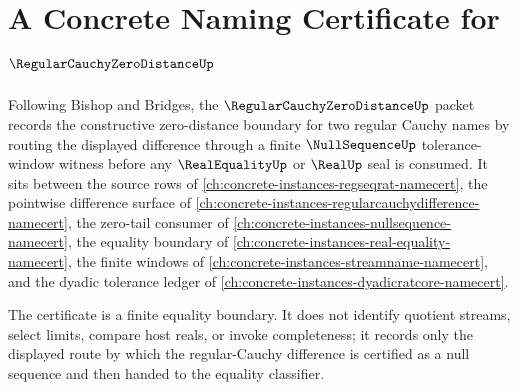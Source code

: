 \chapter{A Concrete Naming Certificate for $\RegularCauchyZeroDistanceUp$}
\label{ch:concrete-instances-regular-cauchy-zero-distance-namecert}

Following Bishop and Bridges, the $\RegularCauchyZeroDistanceUp$ packet records the constructive zero-distance boundary for two regular Cauchy names by routing the displayed difference through a finite $\NullSequenceUp$ tolerance-window witness before any $\RealEqualityUp$ or $\RealUp$ seal is consumed. It sits between the source rows of \autoref{ch:concrete-instances-regseqrat-namecert}, the pointwise difference surface of \autoref{ch:concrete-instances-regularcauchydifference-namecert}, the zero-tail consumer of \autoref{ch:concrete-instances-nullsequence-namecert}, the equality boundary of \autoref{ch:concrete-instances-real-equality-namecert}, the finite windows of \autoref{ch:concrete-instances-streamname-namecert}, and the dyadic tolerance ledger of \autoref{ch:concrete-instances-dyadicratcore-namecert}.

The certificate is a finite equality boundary. It does not identify quotient streams, select limits, compare host reals, or invoke completeness; it records only the displayed route by which the regular-Cauchy difference is certified as a null sequence and then handed to the equality classifier.

